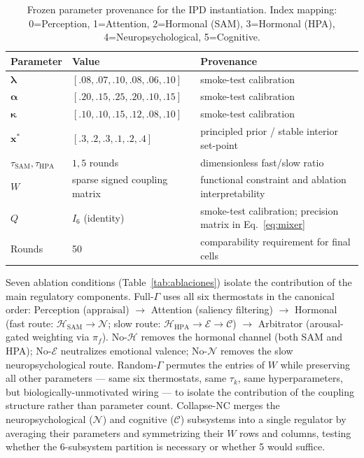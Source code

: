 \documentclass{article}
\begin{document}
\begin{table}[h]
\caption{Frozen parameter provenance for the IPD instantiation. Index mapping: 0=Perception, 1=Attention, 2=Hormonal (SAM), 3=Hormonal (HPA), 4=Neuropsychological, 5=Cognitive.}
\label{tab:params}
\centering
\begin{tabular}{lll}
\toprule
Parameter & Value & Provenance \\
\midrule
$\boldsymbol{\lambda}$ & $[.08,.07,.10,.08,.06,.10]$ & smoke-test calibration \\
$\boldsymbol{\alpha}$ & $[.20,.15,.25,.20,.10,.15]$ & smoke-test calibration \\
$\boldsymbol{\kappa}$ & $[.10,.10,.15,.12,.08,.10]$ & smoke-test calibration \\
$\mathbf{x}^{*}$ & $[.3,.2,.3,.1,.2,.4]$ & principled prior / stable interior set-point \\
$\tau_{\mathrm{SAM}},\tau_{\mathrm{HPA}}$ & $1,5$ rounds & dimensionless fast/slow ratio \\
$W$ & sparse signed coupling matrix & functional constraint and ablation interpretability \\
$Q$ & $I_6$ (identity) & smoke-test calibration; precision matrix in Eq.~\eqref{eq:mixer} \\
Rounds & 50 & comparability requirement for final cells \\
\bottomrule
\end{tabular}
\end{table}

Seven ablation conditions (Table~\ref{tab:ablaciones}) isolate the contribution of the main regulatory components. Full-$\Gamma$ uses all six thermostats in the canonical order: Perception (appraisal) $\to$ Attention (saliency filtering) $\to$ Hormonal (fast route: $\mathcal{H}_{\text{SAM}}{\to}\mathcal{N}$; slow route: $\mathcal{H}_{\text{HPA}}{\to}\mathcal{E}{\to}\mathcal{C}$) $\to$ Arbitrator (arousal-gated weighting via $\pi_f$). No-$\mathcal{H}$ removes the hormonal channel (both SAM and HPA); No-$\mathcal{E}$ neutralizes emotional valence; No-$\mathcal{N}$ removes the slow neuropsychological route. Random-$\Gamma$ permutes the entries of $W$ while preserving all other parameters --- same six thermostats, same $\tau_k$, same hyperparameters, but biologically-unmotivated wiring --- to isolate the contribution of the coupling structure rather than parameter count. Collapse-NC merges the neuropsychological ($\mathcal{N}$) and cognitive ($\mathcal{C}$) subsystems into a single regulator by averaging their parameters and symmetrizing their $W$ rows and columns, testing whether the 6-subsystem partition is necessary or whether 5 would suffice.
\end{document}

